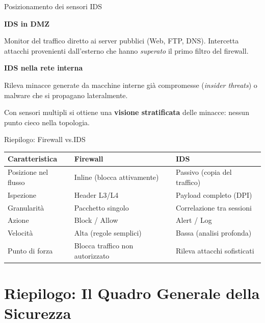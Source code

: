 \documentclass[a4paper,12pt]{report}
\begin{document}
{\newpage
\begin{notebox}{Posizionamento dei sensori IDS}
    
  \textbf{IDS in DMZ}
  
    Monitor del traffico diretto ai server pubblici (Web, FTP, DNS).
    Intercetta attacchi provenienti dall'esterno che hanno \emph{superato}
    il primo filtro del firewall.
    
    \vspace{0.6cm}
  \textbf{IDS nella rete interna}
  
    Rileva minacce generate da macchine interne gi\`a compromesse
    (\textit{insider threats}) o malware che si propagano lateralmente.

Con sensori multipli si ottiene una \textbf{visione stratificata} delle minacce:
nessun punto cieco nella topologia.
\end{notebox}


\begin{notebox}{Riepilogo: Firewall vs.\@ IDS}
\begin{center}
\begin{tabular}{lll}
\toprule
\textbf{Caratteristica} & \textbf{Firewall} & \textbf{IDS} \\
\midrule
Posizione nel flusso & Inline (blocca attivamente) & Passivo (copia del traffico) \\
Ispezione & Header L3/L4 & Payload completo (DPI) \\
Granularit\`a & Pacchetto singolo & Correlazione tra sessioni \\
Azione & Block / Allow & Alert / Log \\
Velocit\`a & Alta (regole semplici) & Bassa (analisi profonda) \\
Punto di forza & Blocca traffico non autorizzato & Rileva attacchi sofisticati \\
\bottomrule
\end{tabular}
\end{center}
\end{notebox}


\newpage

\section{Riepilogo: Il Quadro Generale della Sicurezza}

}
\end{document}
